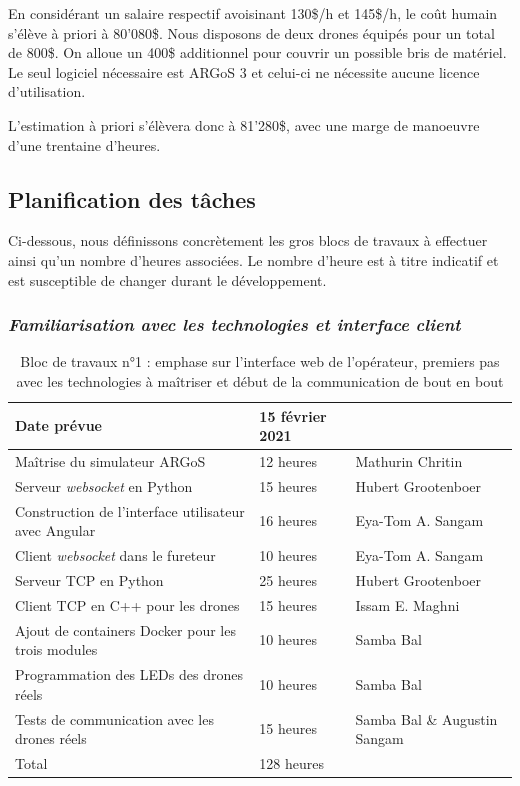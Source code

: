 \documentclass{mistcoursedoc}
\begin{document}
En considérant un salaire respectif avoisinant 130\$/h et 145\$/h, le coût humain s’élève à priori à 80'080\$.
Nous disposons de deux drones équipés pour un total de 800\$.
On alloue un 400\$ additionnel pour couvrir un possible bris de matériel.
Le seul logiciel nécessaire est ARGoS 3 et celui-ci ne nécessite aucune licence d’utilisation.

L’estimation à priori s’élèvera donc à 81'280\$, avec une marge de manoeuvre d'une trentaine d'heures.

\newpage
\subsection{Planification des tâches}

Ci-dessous, nous définissons concrètement les gros blocs de travaux à effectuer ainsi qu'un nombre d'heures associées. Le nombre d'heure est à titre indicatif et est susceptible de changer durant le développement.

\subsubsection{\emph{Familiarisation avec les technologies et interface client}}
\begin{table}[h!]
  \centering
  \begin{tabular}{ M{7cm}M{3cm}M{3.5cm} }
    \hline
    Date prévue                                                          & 15 février 2021 & \tabularnewline\hline
    Maîtrise du simulateur ARGoS                                            & 12 heures        & Mathurin Chritin\tabularnewline
    Serveur \emph{websocket} en Python                                             & 15 heures        & Hubert Grootenboer\tabularnewline
    Construction de l’interface utilisateur avec Angular                    & 16 heures        & Eya-Tom A. Sangam \tabularnewline
    Client \emph{websocket} dans le fureteur                                       & 10 heures        & Eya-Tom A. Sangam\tabularnewline
    Serveur TCP en Python                                                   & 25 heures        & Hubert Grootenboer\tabularnewline
    Client TCP en C++ pour les drones                                       & 15 heures        & Issam E. Maghni\tabularnewline
    Ajout de containers Docker pour les trois modules                       & 10 heures        & Samba Bal\tabularnewline
    Programmation des LEDs des drones réels                                 & 10 heures        & Samba Bal\tabularnewline
    Tests de communication avec les drones réels                            & 15 heures        & Samba Bal \& Augustin Sangam\tabularnewline\hline
    Total & 128 heures & \tabularnewline\hline
  \end{tabular}
  \caption{Bloc de travaux n°1 : emphase sur l'interface web de l'opérateur, premiers pas avec les technologies à maîtriser et début de la communication de bout en bout}
\end{table}
\end{document}

